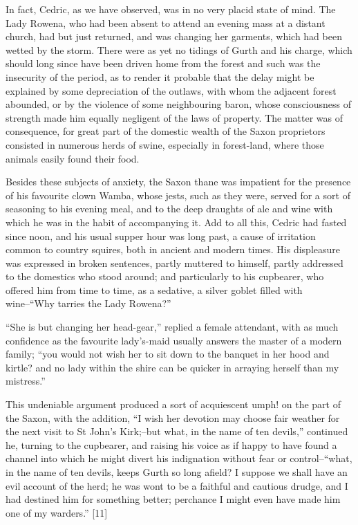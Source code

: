 In fact, Cedric, as we have observed, was in no very placid state of
mind. The Lady Rowena, who had been absent to attend an evening mass at
a distant church, had but just returned, and was changing her garments,
which had been wetted by the storm. There were as yet no tidings of
Gurth and his charge, which should long since have been driven home from
the forest and such was the insecurity of the period, as to render it
probable that the delay might be explained by some depreciation of the
outlaws, with whom the adjacent forest abounded, or by the violence of
some neighbouring baron, whose consciousness of strength made him
equally negligent of the laws of property. The matter was of
consequence, for great part of the domestic wealth of the Saxon
proprietors consisted in numerous herds of swine, especially in
forest-land, where those animals easily found their food.

Besides these subjects of anxiety, the Saxon thane was impatient for the
presence of his favourite clown Wamba, whose jests, such as they were,
served for a sort of seasoning to his evening meal, and to the deep
draughts of ale and wine with which he was in the habit of accompanying
it. Add to all this, Cedric had fasted since noon, and his usual supper
hour was long past, a cause of irritation common to country squires,
both in ancient and modern times. His displeasure was expressed in
broken sentences, partly muttered to himself, partly addressed to the
domestics who stood around; and particularly to his cupbearer, who
offered him from time to time, as a sedative, a silver goblet filled
with wine--``Why tarries the Lady Rowena?''

``She is but changing her head-gear,'' replied a female attendant, with
as much confidence as the favourite lady's-maid usually answers the
master of a modern family; ``you would not wish her to sit down to the
banquet in her hood and kirtle? and no lady within the shire can be
quicker in arraying herself than my mistress.''

This undeniable argument produced a sort of acquiescent umph! on the
part of the Saxon, with the addition, ``I wish her devotion may choose
fair weather for the next visit to St John's Kirk;--but what, in the
name of ten devils,'' continued he, turning to the cupbearer, and
raising his voice as if happy to have found a channel into which he
might divert his indignation without fear or control--``what, in the
name of ten devils, keeps Gurth so long afield? I suppose we shall have
an evil account of the herd; he was wont to be a faithful and cautious
drudge, and I had destined him for something better; perchance I might
even have made him one of my warders.'' {[}11{]}

